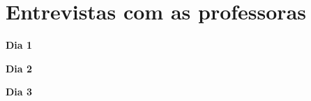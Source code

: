 \chapter{Entrevistas com as professoras}
\label{apendice_transcricoes}

\textbf{Dia 1}




\textbf{Dia 2}




\textbf{Dia 3}

